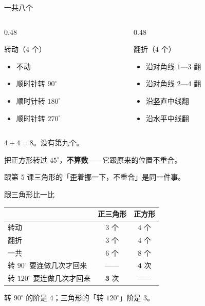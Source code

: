 \documentclass[10pt]{beamer}
\begin{document}
\begin{frame}{一共八个}
  \begin{columns}[T]
    \begin{column}{0.48\textwidth}
      \begin{block}{转动（\(4\) 个）}
        \begin{itemize}
          \item 不动
          \item 顺时针转 \(90^\circ\)
          \item 顺时针转 \(180^\circ\)
          \item 顺时针转 \(270^\circ\)
        \end{itemize}
      \end{block}
    \end{column}
    \begin{column}{0.48\textwidth}
      \begin{block}{翻折（\(4\) 个）}
        \begin{itemize}
          \item 沿对角线 \(1\text{—}3\) 翻
          \item 沿对角线 \(2\text{—}4\) 翻
          \item 沿竖直中线翻
          \item 沿水平中线翻
        \end{itemize}
      \end{block}
    \end{column}
  \end{columns}
  \pause
  \begin{center}
    \(4+4=8\)。\quad 没有第九个。
  \end{center}
  \pause
  \begin{center}
    {\large 把正方形转过 \(45^\circ\)，\textbf{不算数}——它跟原来的位置不重合。}
  \end{center}
  \begin{att}
    跟第 5 课三角形的「歪着挪一下，不重合」是同一件事。
  \end{att}
\end{frame}

\begin{frame}{跟三角形比一比}
  \begin{center}
  \begin{tabular}{@{}lcc@{}}
    \toprule
     & 正三角形 & 正方形 \\
    \midrule
    转动 & \(3\) 个 & \(4\) 个 \\
    翻折 & \(3\) 个 & \(4\) 个 \\
    一共 & \(6\) 个 & \(8\) 个 \\
    \midrule
    转 \(90^\circ\) 要连做几次才回来 & —— & \(\mathbf{4}\) 次 \\
    转 \(120^\circ\) 要连做几次才回来 & \(\mathbf{3}\) 次 & —— \\
    \bottomrule
  \end{tabular}
  \end{center}
  \pause
  \begin{center}
    {\large 转 \(90^\circ\) 的阶是 \(4\)；三角形的「转 \(120^\circ\)」阶是 \(3\)。}
  \end{center}
\end{frame}
\end{document}
